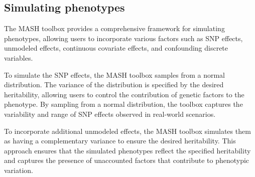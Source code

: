 \documentclass[sn-nature]{sn-jnl}%
\begin{document}
\subsection{Simulating phenotypes}

The MASH toolbox provides a comprehensive framework for simulating phenotypes, allowing users to incorporate various factors such as SNP effects, unmodeled effects, continuous covariate effects, and confounding discrete variables.

To simulate the SNP effects, the MASH toolbox samples from a normal distribution. The variance of the distribution is specified by the desired heritability, allowing users to control the contribution of genetic factors to the phenotype. By sampling from a normal distribution, the toolbox captures the variability and range of SNP effects observed in real-world scenarios.

To incorporate additional unmodeled effects, the MASH toolbox simulates them as having a complementary variance to ensure the desired heritability. This approach ensures that the simulated phenotypes reflect the specified heritability and captures the presence of unaccounted factors that contribute to phenotypic variation.
\end{document}
